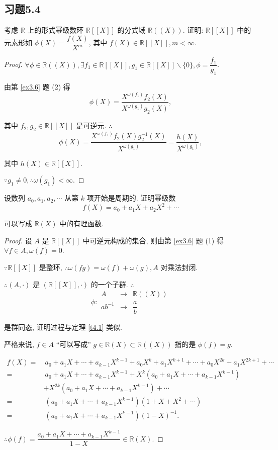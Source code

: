 \documentclass[UTF8]{ctexart}
\begin{document}
\subsection{习题5.4}
\begin{exercise}[4.1]
    考虑 $\mathbb{R}$ 上的形式幂级数环 $\mathbb{R}[[X]]$ 的分式域 $\mathbb{R}((X))$. 证明: $\mathbb{R}[[X]]$ 中的元素形如 $\phi(X)=\dfrac{f(X)}{X^m}$, 其中 $f(X)\in\mathbb{R}[[X]],m<\infty$.
\end{exercise}
\begin{proof}
    $\forall\phi\in\mathbb{R}((X)),\exists f_1\in\mathbb{R}[[X]],g_1\in\mathbb{R}[[X]]\backslash\{0\},\phi=\dfrac{f_1}{g_1}$.

    由第 \ref{ex3.6} 题 (2) 得
    \[\phi(X)=\dfrac{X^{\omega(f_1)}f_2(X)}{X^{\omega(g_1)}g_2(X)},\]

    其中 $f_2,g_2\in\mathbb{R}[[X]]$ 是可逆元. $\therefore$
    \[\phi(X)=\dfrac{X^{\omega(f_1)}f_2(X)g^{-1}_2(X)}{X^{\omega(g_1)}}=\dfrac{h(X)}{X^{\omega(g_1)}},\]

    其中 $h(X)\in\mathbb{R}[[X]]$.

    $\because g_1\neq0,\therefore\omega(g_1)<\infty$.
\end{proof}
\begin{exercise}[4.2]
    设数列 $a_0,a_1,a_2,\cdots$ 从第 $k$ 项开始是周期的. 证明幂级数
    \[f(X)=a_0+a_1X+a_2X^2+\cdots\]

    可以写成 $\mathbb{R}(X)$ 中的有理函数.
\end{exercise}
\begin{proof}
    设 $A$ 是 $\mathbb{R}[[X]]$ 中可逆元构成的集合, 则由第 \ref{ex3.6} 题 (1) 得 $\forall f\in A,\omega(f)=0$.

    $\because\mathbb{R}[[X]]$ 是整环, $\therefore\omega(fg)=\omega(f)+\omega(g),A$ 对乘法封闭.

    $\therefore(A,\cdot)$ 是 $(\mathbb{R}[[X]],\cdot)$ 的一个子群. $\therefore$
    \[\phi:\begin{array}{rcl}
        A & \to & \mathbb{R}((X)) \\
        ab^{-1} & \to & \dfrac{a}{b}
    \end{array}\]

    是群同态, 证明过程与定理 \ref{t4.1} 类似.

    严格来说, $f\in A$ ``可以写成'' $g\in\mathbb{R}(X)\subset\mathbb{R}((X))$ 指的是 $\phi(f)=g$.

    \begin{align*}
        f(X)= & \ a_0+a_1X+\cdots+a_{k-1}X^{k-1}+a_0X^k+a_1X^{k+1}+\cdots+a_0X^{2k}+a_1X^{2k+1}+\cdots \\
        = & \ a_0+a_1X+\cdots+a_{k-1}X^{k-1}+X^k(a_0+a_1X+\cdots+a_{k-1}X^{k-1}) \\
        & +X^{2k}(a_0+a_1X+\cdots+a_{k-1}X^{k-1})+\cdots \\
        = & \ (a_0+a_1X+\cdots+a_{k-1}X^{k-1})(1+X+X^2+\cdots) \\
        = & \ (a_0+a_1X+\cdots+a_{k-1}X^{k-1})(1-X)^{-1}.
    \end{align*}

    $\therefore\phi(f)=\dfrac{a_0+a_1X+\cdots+a_{k-1}X^{k-1}}{1-X}\in\mathbb{R}(X)$.
\end{proof}
\end{document}
